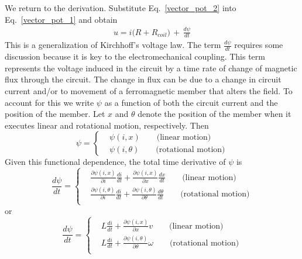 \documentclass[11pt,a4paper,oneside]{book}
\numberwithin{equation}{section}
\theoremstyle{it}
\theoremstyle{definition}
\begin{document}
We return to the derivation. Substitute Eq.~\eqref{vector_pot_2} into Eq.~\eqref{vector_pot_1} and obtain
 \begin{equation}\label{vector_pot_3}
	\begin{aligned}
		u = i\big(R+R_{coil}\big)\, + \, \frac{d \psi}{d t}
	\end{aligned}
\end{equation} 
This is a generalization of Kirchhoff's voltage law. The term $\frac{d \psi}{d t}$ requires some discussion because it is key to the electromechanical coupling. This term represents the voltage induced in the circuit by a time rate of change of magnetic flux through the circuit. The change in flux can be due to a change in circuit current and/or to movement of a ferromagnetic member that alters the field. To account for this we write $\psi$ as a function of both the circuit current and the position of the member. Let $x$ and $\theta$ denote the position of the member when it executes linear and rotational motion, respectively. Then
 \begin{equation*}\label{}
	\psi = \left\lbrace 
	\begin{aligned}
		&\psi(i,x)\qquad\text{(linear motion)} \\[8pt]
		&\psi(i,\theta)\qquad\text{(rotational motion)} 
	\end{aligned}\right. 
\end{equation*}
Given this functional dependence, the total time derivative of $\psi$ is
 \begin{equation*}\label{}
	\frac{d\psi }{dt} = \left\lbrace 
	\begin{aligned}
		&\frac{\partial \psi(i,x)}{\partial i}\frac{d i}{d t} + \frac{\partial \psi(i,x)}{\partial x}\frac{d x}{d t} \qquad\text{(linear motion)} \\[8pt]
		&\frac{\partial \psi(i,\theta)}{\partial i}\frac{d i}{d t} + \frac{\partial \psi(i,\theta)}{\partial \theta}\frac{d \theta}{d t} \qquad\text{(rotational motion)} \\[8pt]
	\end{aligned}\right. 
\end{equation*}
or 
 \begin{equation}\label{}
	\frac{d\psi }{dt} = \left\lbrace 
	\begin{aligned}
		&L\frac{d i}{d t} + \frac{\partial \psi(i,x)}{\partial x}v \qquad\text{(linear motion)} \\[8pt]
		&L\frac{d i}{d t} + \frac{\partial \psi(i,\theta)}{\partial \theta}\omega \qquad\text{(rotational motion)} \\[8pt]
	\end{aligned}\right. 
\end{equation}
\end{document}
